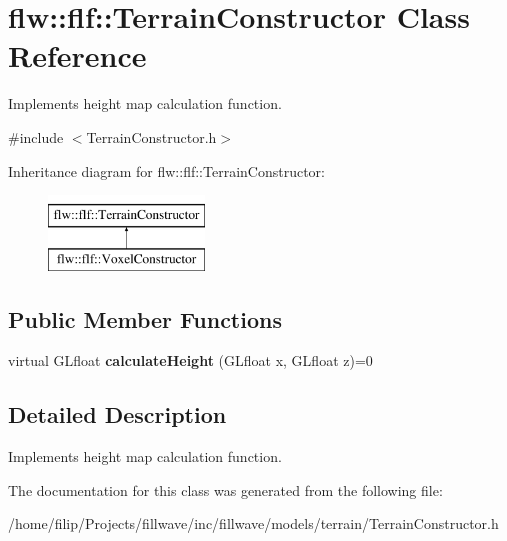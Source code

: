\hypertarget{classflw_1_1flf_1_1TerrainConstructor}{}\section{flw\+:\+:flf\+:\+:Terrain\+Constructor Class Reference}
\label{classflw_1_1flf_1_1TerrainConstructor}


Implements height map calculation function.  




{\ttfamily \#include $<$Terrain\+Constructor.\+h$>$}

Inheritance diagram for flw\+:\+:flf\+:\+:Terrain\+Constructor\+:\begin{figure}[H]
\begin{center}
\leavevmode
\includegraphics[height=2.000000cm]{classflw_1_1flf_1_1TerrainConstructor}
\end{center}
\end{figure}
\subsection*{Public Member Functions}
\begin{DoxyCompactItemize}
\item 
virtual G\+Lfloat {\bfseries calculate\+Height} (G\+Lfloat x, G\+Lfloat z)=0\hypertarget{classflw_1_1flf_1_1TerrainConstructor_aea7e64bfd2697ebd8f358efa82e444e3}{}\label{classflw_1_1flf_1_1TerrainConstructor_aea7e64bfd2697ebd8f358efa82e444e3}

\end{DoxyCompactItemize}


\subsection{Detailed Description}
Implements height map calculation function. 

The documentation for this class was generated from the following file\+:\begin{DoxyCompactItemize}
\item 
/home/filip/\+Projects/fillwave/inc/fillwave/models/terrain/Terrain\+Constructor.\+h\end{DoxyCompactItemize}
